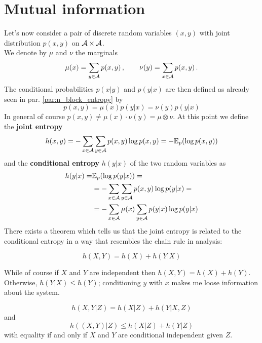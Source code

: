 \section{Mutual information}
\label{par:mutual_information}
Let's now consider a pair of discrete random variables $(x, y)$ with joint distribution $p(x, y)$ on $\mathcal{A} \times \mathcal{A}$.   
\\We denote by $\mu$ and $\nu$ the marginals 
\begin{equation}
    \mu(x) = \sum_{y \in \mathcal{A}} p(x,y) \, , \qquad \nu(y) = \sum_{x \in \mathcal{A}} p(x,y) \, .
\end{equation}
The conditional probabilities $p(x|y)$ and $p(y|x)$ are then defined as already seen in par. \cref{par:n_block_entropy} by 
\begin{equation}
    p(x,y) = \mu(x) p(y|x) = \nu(y) p(y|x) 
\end{equation}
In general of course $p(x,y) \neq \mu(x) \cdot \nu(y) = \mu \otimes \nu$. At this point we define the \textbf{joint entropy} 
\begin{equation}
    h(x,y) = - \sum_{x \in \mathcal{A}} \sum_{y \in \mathcal{A}} p(x,y) \log p(x,y) = - \mathbb{E}_p (\log p(x,y))
\end{equation}
and the \textbf{conditional entropy} $h(y|x)$ of the two random variables as
\begin{align}
    h(y|x) = & \mathbb{E}_p (\log p(y|x)) = \\ 
    & = - \sum_{x \in \mathcal{A}} \sum_{y \in \mathcal{A}} p(x,y) \log p(y|x) = \\ & = - \sum_{x \in \mathcal{A}} \mu(x) \sum_{y \in \mathcal{A}} p(y|x) \log p(y|x)    
\end{align}
There exists a theorem which tells us that the joint entropy is related to the conditional entropy in a way that resembles the chain rule in analysis:
\begin{theorem}
\label{th:chain_rule_entropy}
    \begin{equation}
        h(X,Y) = h(X) + h(Y|X)
    \end{equation}
\end{theorem}
While of course if $X$ and $Y$ are independent then $h(X,Y) = h(X) + h(Y)$. Otherwise, $h(Y|X) \leq h(Y)$; conditioning $y$ with $x$ makes me loose information about the system.
\begin{corollary}
    \begin{equation}
        h(X, Y|Z) = h(X|Z) + h(Y| X,Z)
    \end{equation}
    and
    \begin{equation}
        h((X, Y)|Z) \leq h(X|Z) + h(Y|Z)
    \end{equation}
    with equality if and only if $X$ and $Y$ are conditional independent given $Z$.
\end{corollary}
